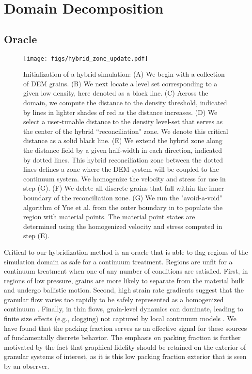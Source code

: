 \section{Domain Decomposition}

\subsection{Oracle}

\begin{figure}[htp] 
    \centering
    \texttt{[image: figs/hybrid\_zone\_update.pdf]}
    \caption{Initialization of a hybrid simulation: (A) We begin with a collection of DEM grains. (B) We next locate a level
    set corresponding to a given low density, here denoted as a black line. (C) Across the domain, we compute
    the distance to the density threshold, indicated by lines in lighter shades of red as the distance increases.
    (D) We select a user-tunable distance to the density level-set that serves as the center of the hybrid
    ``reconciliation" zone. We denote this critical distance as a solid black line. (E) We extend the hybrid zone
    along the distance field by a given half-width in each direction, indicated by dotted lines. This hybrid
    reconciliation zone between the dotted lines defines a zone where the DEM system will be coupled to the
    continuum system. We homogenize the velocity and stress for use in step (G). (F) We delete all discrete grains that fall within the inner boundary of the reconciliation zone.
    (G) We run the "avoid-a-void" algorithm of Yue et al. \cite{Yue:2015:Continuum} from the outer boundary in to populate the region with material points. The material point states are determined using the homogenized velocity and stress computed in step (E).}
    \label{hybrid_initialization}
\end{figure}
Critical to our hybridization method is an oracle that is able to flag regions of the simulation domain as safe for a
continuum treatment. Regions are unfit for a continuum treatment when one of any number of conditions are satisfied.
First, in regions of low pressure, grains are more likely to separate from the material bulk and undergo ballistic
motion. Second, high strain rate gradients suggest that the granular flow varies too rapidly to be safely represented as
a homogenized continuum \cite{Dijksman:2010:Granular,Kamrin:2010,Koval:2009:Annular}. Finally, in thin flows,
grain-level dynamics can dominate, leading to finite size effects (e.g., clogging) not captured by local continuum models
\cite{Beverloo:1961:Flow,Midi:2004:Dense,Pouliquen:1999:Scaling,Sheldon:2010:Granular}. We have found that the packing
fraction serves as an effective signal for these sources of fundamentally discrete behavior. The emphasis on packing fraction
is further motivated by the fact that graphical fidelity should be retained on the exterior of granular systems of interest, as it is this
low packing fraction exterior that is seen by an observer.

